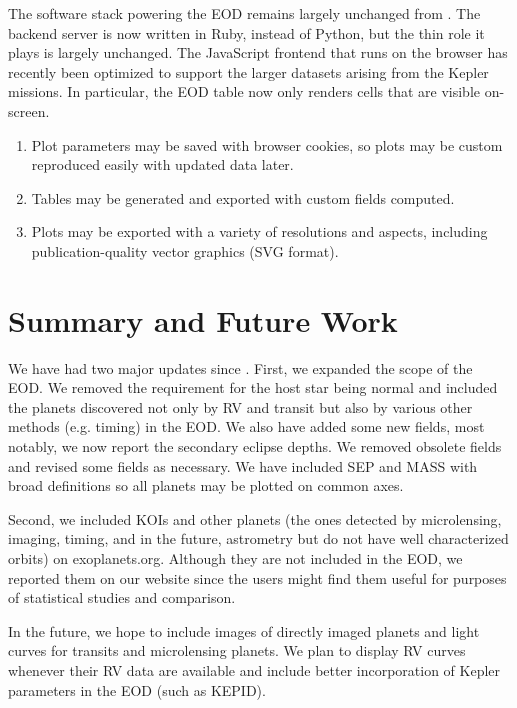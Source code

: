 \documentclass[11pt,preprint]{aastex}
\begin{document}
\begin{CJK*}{UTF8}{gbsn}
The software stack powering the EOD remains largely unchanged from
\cite{Wright2011}. The backend server is now written in Ruby, instead
of Python, but the thin role it plays is largely unchanged.  The
JavaScript frontend that runs on the browser has recently been
optimized to support the larger datasets arising from the Kepler
missions.  In particular, the EOD table now only renders cells that
are visible on-screen. 
\begin{enumerate}
\item Plot parameters may be saved with browser cookies, so plots may
  be custom reproduced easily with updated data later. 
\item Tables may be generated and exported with custom fields
  computed. 
\item Plots may be exported with a variety of resolutions and aspects,
  including publication-quality vector graphics (SVG format).  
\end{enumerate}

\section{Summary and Future Work}\label{sec:summary}

We have had two major updates since \cite{Wright2011}. First, we
expanded the scope of the EOD. We removed the requirement for the host
star being normal and included the planets discovered not only by RV
and transit but also by various other methods (e.g. timing) in the
EOD. We also have added some new fields, most notably, we now report
the secondary eclipse depths. We removed obsolete fields and revised
some fields as necessary. We have included SEP and MASS with broad
definitions so all planets may be plotted on common axes.

Second, we included KOIs and other planets (the ones detected by
microlensing, imaging, timing, and in the future, astrometry but do
not have well characterized orbits) on exoplanets.org. Although they
are not included in the EOD, we reported them on our website since the
users might find them useful for purposes of statistical studies and
comparison.

In the future, we hope to include images of directly imaged planets
and light curves for transits and microlensing planets. We plan to
display RV curves whenever their RV data are available and include
better incorporation of Kepler parameters in the EOD (such as KEPID).


\end{CJK*}
\end{document}
